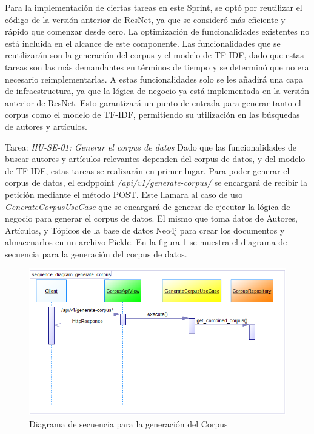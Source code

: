 Para la implementación de ciertas tareas en este Sprint, se optó por reutilizar el código de la versión anterior de ResNet, ya que se consideró más eficiente y rápido que comenzar desde cero.
La optimización de funcionalidades existentes no está incluida en el alcance de este componente.
Las funcionalidades que se reutilizarán son la generación del corpus y el modelo de TF-IDF,
dado que estas tareas son las más demandantes en términos de tiempo y se determinó que no era necesario reimplementarlas.
A estas funcionalidades solo se les añadirá una capa de infraestructura,
ya que la lógica de negocio ya está implementada en la versión anterior de ResNet.
Esto garantizará un punto de entrada para generar tanto el corpus como el modelo de TF-IDF,
permitiendo su utilización en las búsquedas de autores y artículos.

Tarea: \textit{HU-SE-01: Generar el corpus de datos}
Dado que las funcionalidades de buscar autores y artículos relevantes dependen del corpus de datos, y del modelo de TF-IDF, estas tareas se realizarán en primer lugar.
Para poder generar el corpus de datos, el endppoint \textit{/api/v1/generate-corpus/} se encargará de recibir la petición mediante el método POST.
Este llamara al caso de uso \textit{GenerateCorpusUseCase} que se encargará de generar de ejecutar la lógica de negocio para generar el corpus de datos.
El mismo que toma datos de Autores, Artículos, y Tópicos de la base de datos Neo4j para crear los documentos y almacenarlos en un archivo Pickle.
En la figura \ref{fig:sequence-diagram-generate-corpus} se muestra el diagrama de secuencia para la generación del corpus de datos.

\begin{figure}[H]
    \centering
    \includegraphics[scale=0.8]{../02Figures/02Chapter/Sprints/Sprint-4/sequence_diagram_generate_corpus.png}
    \caption{Diagrama de secuencia para la generación del Corpus}
    \label{fig:sequence-diagram-generate-corpus}
\end{figure}

